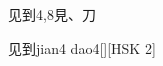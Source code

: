 \begin{entry}{见到}{4,8}{⾒、⼑}
  \begin{phonetics}{见到}{jian4 dao4}[][HSK 2]
  \end{phonetics}
\end{entry}
